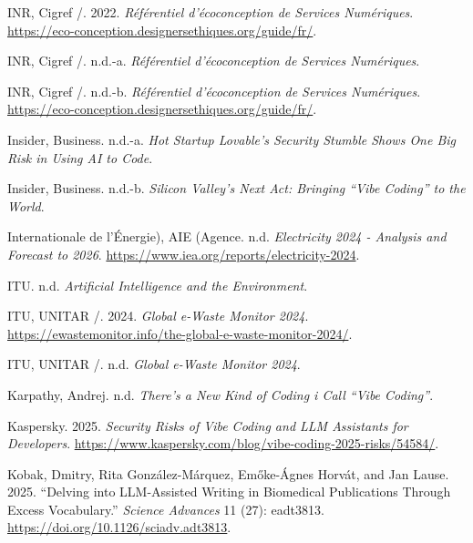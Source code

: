 \documentclass[
  10pt,
  a4paper,
  DIV=11,
  numbers=noendperiod,
  oneside]{scrreprt}
\newlength{\cslhangindent}
\newenvironment{CSLReferences}[2] %
 {\begin{list}{}{%
  \setlength{\itemindent}{0pt}
  \setlength{\leftmargin}{0pt}
  \setlength{\parsep}{0pt}
  \ifodd #1
   \setlength{\leftmargin}{\cslhangindent}
   \setlength{\itemindent}{-1\cslhangindent}
  \fi
  \setlength{\itemsep}{#2\baselineskip}}}
 {\end{list}}
\let\oldemph\emph
\renewcommand{\emph}[1]{\oldemph{\textcolor{cmmgray}{#1}}}
\begin{document}
\begin{CSLReferences}{1}{1}
INR, Cigref /. 2022. \emph{Référentiel d'écoconception de Services
Numériques}.
\url{https://eco-conception.designersethiques.org/guide/fr/}.

INR, Cigref /. n.d.-a. \emph{Référentiel d'écoconception de Services
Numériques}.

INR, Cigref /. n.d.-b. \emph{Référentiel d'écoconception de Services
Numériques}.
\url{https://eco-conception.designersethiques.org/guide/fr/}.

Insider, Business. n.d.-a. \emph{Hot Startup Lovable's Security Stumble
Shows One Big Risk in Using AI to Code}.

Insider, Business. n.d.-b. \emph{Silicon Valley's Next Act: Bringing
{``Vibe Coding''} to the World}.

Internationale de l'Énergie), AIE (Agence. n.d. \emph{Electricity 2024 -
Analysis and Forecast to 2026}.
\url{https://www.iea.org/reports/electricity-2024}.

ITU. n.d. \emph{Artificial Intelligence and the Environment}.

ITU, UNITAR /. 2024. \emph{Global e-Waste Monitor 2024}.
\url{https://ewastemonitor.info/the-global-e-waste-monitor-2024/}.

ITU, UNITAR /. n.d. \emph{Global e-Waste Monitor 2024}.

Karpathy, Andrej. n.d. \emph{There's a New Kind of Coding i Call {``Vibe
Coding''}}.

Kaspersky. 2025. \emph{Security Risks of Vibe Coding and LLM Assistants
for Developers}.
\url{https://www.kaspersky.com/blog/vibe-coding-2025-risks/54584/}.

Kobak, Dmitry, Rita González-Márquez, Emőke-Ágnes Horvát, and Jan Lause.
2025. {``Delving into LLM-Assisted Writing in Biomedical Publications
Through Excess Vocabulary.''} \emph{Science Advances} 11 (27): eadt3813.
\url{https://doi.org/10.1126/sciadv.adt3813}.


\end{CSLReferences}
\end{document}
